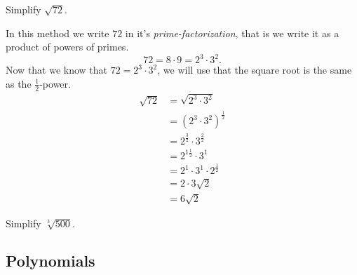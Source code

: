 \begin{exercise}
Simplify $\sqrt{72}$.
\end{exercise}
\begin{solution}[1.5in]
In this method we write $72$ in it's \emph{prime-factorization}, that is we
write it as a product of powers of primes.
\[
72=8\cdot9=2^3\cdot3^2.
\]
Now that we know that $72=2^3\cdot3^2$, we will use that the square root is
the same as the $\frac{1}{2}$-power.
\begin{align*}
\sqrt{72}&=\sqrt{2^3\cdot3^2}\\
&=\left(2^3\cdot3^2\right)^{\frac{1}{2}}\\
&=2^{\frac{3}{2}}\cdot3^{\frac{2}{2}}\\
&=2^{1\frac{1}{2}}\cdot3^{1}\\
&=2^1\cdot3^1\cdot2^{\frac{1}{2}}\\
&=2\cdot3\sqrt{2}\\
&=6\sqrt{2}
\end{align*}
\end{solution}
\vspace{0.5em}
\begin{exercise}
Simplify $\sqrt[3]{500}$.
\end{exercise}
\begin{solution}[3in]

\end{solution}

\subsection{Polynomials}
